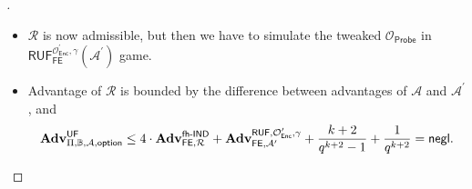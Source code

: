 \begin{frame}{}

\begin{proof}[]

\begin{itemize}
	
	\item<1-> $\mathcal{R}$ is now admissible, but then we have to simulate the tweaked $\mathcal{O}_{\textsf{Probe}}$ in $\textsf{RUF}^{\mathcal{O}^\prime_{\textsf{Enc}}, \gamma}_{\textsf{FE}}(\mathcal{A}^\prime)$ game.

	\item<2-> Advantage of $\mathcal{R}$ is bounded by the difference between advantages of $\mathcal{A}$ and $\mathcal{A}^\prime$, and
	\[
		\mathbf{Adv}^{\textsf{UF}}_{\Pi, \mathbb{B}, \mathcal{A}, \textsf{option}} \leq 4 \cdot \mathbf{Adv}_{\textsf{FE}, \mathcal{R}}^{\textsf{fh-IND}} + \mathbf{Adv}_{\textsf{FE}, \mathcal{A}^\prime}^{\textsf{RUF}, \mathcal{O}^\prime_{\textsf{Enc}}, \gamma} + \frac{k+2}{q^{k+2}-1} + \frac{1}{q^{k+2}} = \mathsf{negl}.
	\]
\end{itemize}
\end{proof}

\end{frame}

